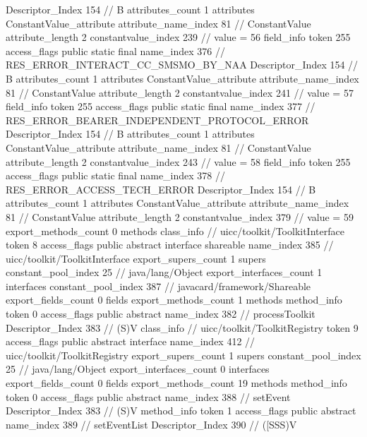 {{{{{				Descriptor_Index	154		// B
				attributes_count	1
				attributes {
				ConstantValue_attribute {
					attribute_name_index	81		// ConstantValue
					attribute_length	2
					constantvalue_index	239		// value = 56
				}
				}
			}
			field_info {
				token	255
				access_flags	public static final
				name_index	376		// RES_ERROR_INTERACT_CC_SMSMO_BY_NAA
				Descriptor_Index	154		// B
				attributes_count	1
				attributes {
				ConstantValue_attribute {
					attribute_name_index	81		// ConstantValue
					attribute_length	2
					constantvalue_index	241		// value = 57
				}
				}
			}
			field_info {
				token	255
				access_flags	public static final
				name_index	377		// RES_ERROR_BEARER_INDEPENDENT_PROTOCOL_ERROR
				Descriptor_Index	154		// B
				attributes_count	1
				attributes {
				ConstantValue_attribute {
					attribute_name_index	81		// ConstantValue
					attribute_length	2
					constantvalue_index	243		// value = 58
				}
				}
			}
			field_info {
				token	255
				access_flags	public static final
				name_index	378		// RES_ERROR_ACCESS_TECH_ERROR
				Descriptor_Index	154		// B
				attributes_count	1
				attributes {
				ConstantValue_attribute {
					attribute_name_index	81		// ConstantValue
					attribute_length	2
					constantvalue_index	379		// value = 59
				}
				}
			}
			}
			export_methods_count	0
			methods {
			}
		}
		class_info {		// uicc/toolkit/ToolkitInterface
			token	8
			access_flags	public abstract interface shareable
			name_index	385		// uicc/toolkit/ToolkitInterface
			export_supers_count	1
			supers {
				constant_pool_index	25		// java/lang/Object
			}
			export_interfaces_count	1
			interfaces {
				constant_pool_index	387		// javacard/framework/Shareable
			}
			export_fields_count	0
			fields {
			}
			export_methods_count	1
			methods {
				method_info {
					token	0
					access_flags	public abstract
					name_index	382		// processToolkit
					Descriptor_Index	383		// (S)V
				}
			}
		}
		class_info {		// uicc/toolkit/ToolkitRegistry
			token	9
			access_flags	public abstract interface
			name_index	412		// uicc/toolkit/ToolkitRegistry
			export_supers_count	1
			supers {
				constant_pool_index	25		// java/lang/Object
			}
			export_interfaces_count	0
			interfaces {
			}
			export_fields_count	0
			fields {
			}
			export_methods_count	19
			methods {
				method_info {
					token	0
					access_flags	public abstract
					name_index	388		// setEvent
					Descriptor_Index	383		// (S)V
				}
				method_info {
					token	1
					access_flags	public abstract
					name_index	389		// setEventList
					Descriptor_Index	390		// ([SSS)V
}}}}}
